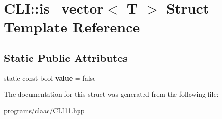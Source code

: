 \hypertarget{struct_c_l_i_1_1is__vector}{}\section{C\+LI\+:\+:is\+\_\+vector$<$ T $>$ Struct Template Reference}
\label{struct_c_l_i_1_1is__vector}
\subsection*{Static Public Attributes}
\begin{DoxyCompactItemize}
\item 
\mbox{\label{struct_c_l_i_1_1is__vector_a58b2d10b867ddfd6a71a70497fa20a19}} 
static const bool {\bfseries value} = false
\end{DoxyCompactItemize}


The documentation for this struct was generated from the following file\+:\begin{DoxyCompactItemize}
\item 
programs/claac/C\+L\+I11.\+hpp\end{DoxyCompactItemize}
